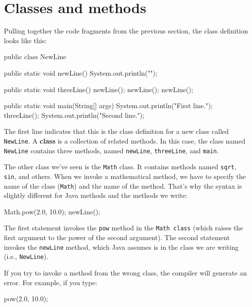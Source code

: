 

\section{Classes and methods}


Pulling together the code fragments from the previous section, the class definition looks like this:

\begin{code}
public class NewLine {

    public static void newLine() {
        System.out.println("");
    }

    public static void threeLine() {
        newLine();  newLine();  newLine();
    }

    public static void main(String[] args) {
        System.out.println("First line.");
        threeLine();
        System.out.println("Second line.");
    }
}
\end{code}

The first line indicates that this is the class definition for a new class called {\tt NewLine}.
A {\bf class} is a collection of related methods.
In this case, the class named {\tt NewLine} contains three methods, named {\tt newLine}, {\tt threeLine}, and {\tt main}.

The other class we've seen is the {\tt Math} class.
It contains methods named {\tt sqrt}, {\tt sin}, and others.
When we invoke a mathematical method, we have to specify the name of the class ({\tt Math}) and the name of the method.
That's why the syntax is slightly different for Java methods and the methods we write:

\begin{code}
    Math.pow(2.0, 10.0);
    newLine();
\end{code}

The first statement invokes the {\tt pow} method in the {\tt Math class} (which raises the first argument to the power of the second argument).
The second statement invokes the {\tt newLine} method, which Java assumes is in the class we are writing (i.e., {\tt NewLine}).

If you try to invoke a method from the wrong class, the compiler will generate an error.
For example, if you type:

\begin{code}
    pow(2.0, 10.0);
\end{code}

